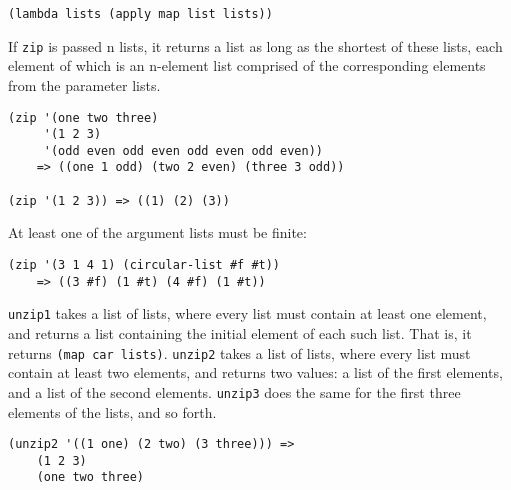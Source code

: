 \begin{entry}{%
  }

\begin{verbatim}
(lambda lists (apply map list lists))
\end{verbatim}

  If \texttt{zip} is passed n lists, it returns a list as long as the
  shortest of these lists, each element of which is an n-element list
  comprised of the corresponding elements from the parameter lists.

\begin{verbatim}
(zip '(one two three) 
     '(1 2 3)
     '(odd even odd even odd even odd even))
    => ((one 1 odd) (two 2 even) (three 3 odd))

(zip '(1 2 3)) => ((1) (2) (3))
\end{verbatim}

  At least one of the argument lists must be finite:

\begin{verbatim}
(zip '(3 1 4 1) (circular-list #f #t)) 
    => ((3 #f) (1 #t) (4 #f) (1 #t))
\end{verbatim}
\end{entry}

\begin{entry}{%
  }

  \texttt{unzip1} takes a list of lists, where every list must
  contain at least one element, and returns a list containing the
  initial element of each such list. That is, it returns \texttt{(map\
    car\ lists)}.  \texttt{unzip2} takes a list of lists, where every
  list must contain at least two elements, and returns two values: a
  list of the first elements, and a list of the second
  elements. \texttt{unzip3} does the same for the first three elements
  of the lists, and so forth.

\begin{verbatim}
(unzip2 '((1 one) (2 two) (3 three))) =>
    (1 2 3) 
    (one two three)
\end{verbatim}
\end{entry}

